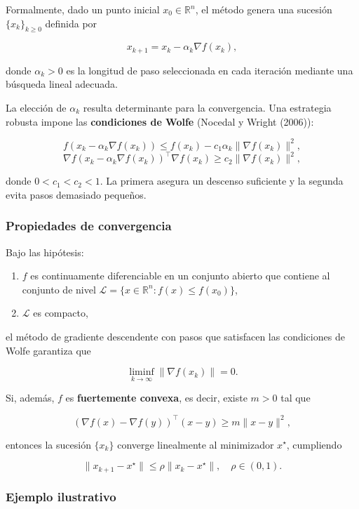 \documentclass[
  spanish,
  us-letterpaper,
  DIV=11,
  numbers=noendperiod]{scrreprt}
\providecommand{\tightlist}{%
  \setlength{\itemsep}{0pt}\setlength{\parskip}{0pt}}
\numberwithin{equation}{section}
\begin{document}
Formalmente, dado un punto inicial \(x_0 \in \mathbb{R}^n\), el método
genera una sucesión \(\{x_k\}_{k \geq 0}\) definida por

\[
  x_{k+1} = x_k - \alpha_k \nabla f(x_k),
\]

donde \(\alpha_k > 0\) es la longitud de paso seleccionada en cada
iteración mediante una búsqueda lineal adecuada.

La elección de \(\alpha_k\) resulta determinante para la convergencia.
Una estrategia robusta impone las \textbf{condiciones de Wolfe} (Nocedal
y Wright (2006)):

\[
  f(x_k - \alpha_k \nabla f(x_k)) \le f(x_k) - c_1 \alpha_k \|\nabla f(x_k)\|^2,
\] \[
  \nabla f(x_k - \alpha_k \nabla f(x_k))^\top \nabla f(x_k) \ge c_2 \|\nabla f(x_k)\|^2,
\]

donde \(0 < c_1 < c_2 < 1\). La primera asegura un descenso suficiente y
la segunda evita pasos demasiado pequeños.

\subsubsection{Propiedades de
convergencia}\label{propiedades-de-convergencia}

Bajo las hipótesis:

\begin{enumerate}
\def\labelenumi{\arabic{enumi}.}
\tightlist
\item
  \(f\) es continuamente diferenciable en un conjunto abierto que
  contiene al conjunto de nivel
  \(\mathcal{L} = \{x \in \mathbb{R}^n : f(x) \le f(x_0)\}\),
\item
  \(\mathcal{L}\) es compacto,
\end{enumerate}

el método de gradiente descendente con pasos que satisfacen las
condiciones de Wolfe garantiza que

\[
  \liminf_{k \to \infty} \|\nabla f(x_k)\| = 0.
\]

Si, además, \(f\) es \textbf{fuertemente convexa}, es decir, existe
\(m > 0\) tal que

\[
  (\nabla f(x) - \nabla f(y))^\top (x - y) \ge m \|x - y\|^2,
\]

entonces la sucesión \(\{x_k\}\) converge linealmente al minimizador
\(x^\star\), cumpliendo

\[
  \|x_{k+1} - x^\star\| \le \rho \|x_k - x^\star\|, \quad \rho \in (0,1).
\]

\subsubsection{Ejemplo ilustrativo}\label{ejemplo-ilustrativo-8}
\end{document}
